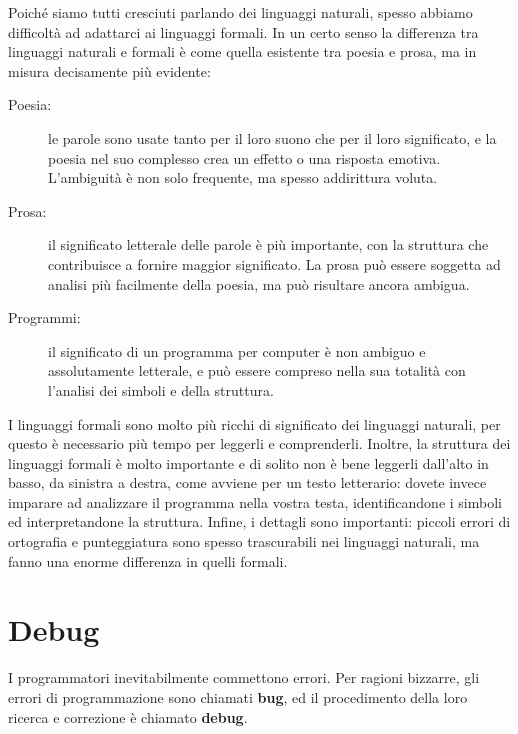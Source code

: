\documentclass[10pt]{book}
\begin{document}
Poiché siamo tutti cresciuti parlando dei linguaggi naturali, spesso abbiamo difficoltà ad adattarci ai linguaggi formali. In un certo senso la differenza tra linguaggi naturali e formali è come quella esistente tra poesia e prosa, ma in misura decisamente più evidente:

\begin{description}

\item[Poesia:] le parole sono usate tanto per il loro suono che per il loro     significato, e la poesia nel suo complesso crea un effetto o una risposta emotiva. L'ambiguità è non solo frequente, ma spesso addirittura voluta.

\item[Prosa:] il significato letterale delle parole è più importante, con la    struttura che contribuisce a fornire maggior significato. La prosa può essere soggetta ad analisi più facilmente della poesia, ma può risultare ancora ambigua.

\item[Programmi:] il significato di un programma per computer è non ambiguo e    assolutamente letterale, e può essere compreso nella sua totalità con l'analisi dei simboli e della struttura.

\end{description}

I linguaggi formali sono molto più ricchi di significato dei linguaggi naturali, per questo è necessario più tempo per leggerli e comprenderli. Inoltre, la struttura dei linguaggi formali è molto importante e di solito non è bene leggerli dall'alto in basso, da sinistra a destra, come avviene per un testo letterario: dovete invece imparare ad analizzare il programma nella vostra testa, identificandone i simboli ed interpretandone la struttura. Infine, i dettagli sono importanti: piccoli errori di ortografia e punteggiatura sono spesso trascurabili nei linguaggi naturali, ma fanno una enorme differenza in quelli formali.

\section{Debug}

I programmatori inevitabilmente commettono errori. Per ragioni bizzarre, gli errori di programmazione sono chiamati {\bf bug}, ed il procedimento della loro ricerca e correzione è chiamato {\bf debug}.
\end{document}
